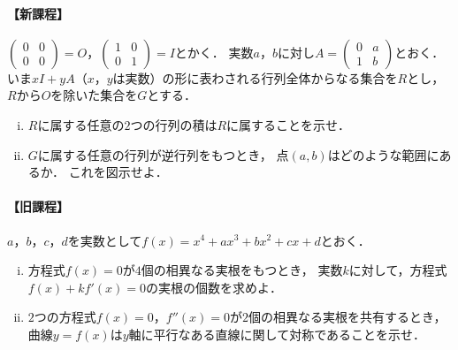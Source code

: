 \documentclass[../../main.tex]{subfiles}
\begin{document}
\paragraph{【新課程】}
$
\begin{pmatrix} 0 & 0 \\ 0 & 0
\end{pmatrix}=O$，$
\begin{pmatrix} 1 & 0 \\ 0 & 1
\end{pmatrix}=I$とかく．
実数$a$，$b$に対し$A=
\begin{pmatrix} 0 & a \\ 1 & b
\end{pmatrix}$とおく．
いま$xI+yA$（$x$，$y$は実数）の形に表わされる行列全体からなる集合を$R$とし，
$R$から$O$を除いた集合を$G$とする．
\begin{enumerate}[(i)]
  \item $R$に属する任意の$2$つの行列の積は$R$に属することを示せ．
  \item $G$に属する任意の行列が逆行列をもつとき，
    点$(a,b)$はどのような範囲にあるか．
    これを図示せよ．
\end{enumerate}

\paragraph{【旧課程】}
$a$，$b$，$c$，$d$を実数として$f(x)=x^4+ax^3+bx^2+cx+d$とおく．
\begin{enumerate}[(i)]
  \item 方程式$f(x)=0$が$4$個の相異なる実根をもつとき，
    実数$k$に対して，方程式$f(x)+kf'(x)=0$の実根の個数を求めよ．
  \item $2$つの方程式$f(x)=0$，$f''(x)=0$が$2$個の相異なる実根を共有するとき，
    曲線$y=f(x)$は$y$軸に平行なある直線に関して対称であることを示せ．
\end{enumerate}
\end{document}
